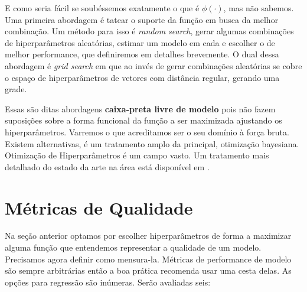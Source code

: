 E como seria fácil se soubéssemos exatamente o que é $\phi(\cdot)$, mas não sabemos. Uma primeira abordagem é tatear o suporte da função em busca da melhor combinação. Um método para isso é \textit{random search}, gerar algumas combinações de hiperparâmetros aleatórias, estimar um modelo em cada e escolher o de melhor performance, que definiremos em detalhes brevemente. O dual dessa abordagem é \textit{grid search} em que ao invés de gerar combinações aleatórias se cobre o espaço de hiperparâmetros de vetores com distância regular, gerando uma grade. 

Essas são ditas abordagens \textbf{caixa-preta livre de modelo} pois não fazem suposições sobre a forma funcional da função a ser maximizada ajustando os hiperparâmetros. Varremos o que acreditamos ser o seu domínio à força bruta. Existem alternativas,  é um tratamento amplo da principal, otimização bayesiana. Otimização de Hiperparâmetros é um campo vasto. Um tratamento mais detalhado do estado da arte na área está disponível em .


\begin{figure}[H]
    \centering
    
\end{figure}

\section{Métricas de Qualidade}

Na seção anterior optamos por escolher hiperparâmetros de forma a maximizar alguma função que entendemos representar a qualidade de um modelo. Precisamos agora definir como mensura-la. Métricas de performance de modelo são sempre arbitrárias então a boa prática recomenda usar uma cesta delas. As opções para regressão são inúmeras. Serão avaliadas seis: 

